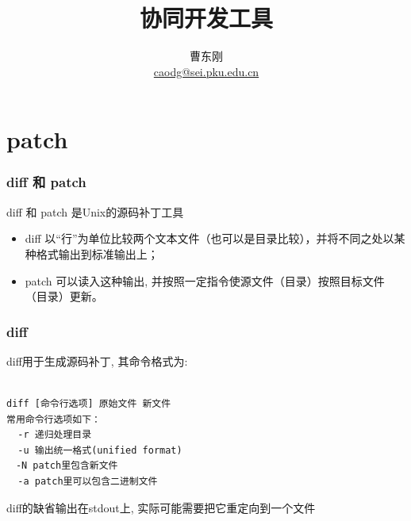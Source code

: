 \documentclass[compress]{beamer}
\begin{document}
					
\title{协同开发工具}

\author[\href{http://c.pku.edu.cn/}{http://c.pku.edu.cn/}]
{曹东刚\\\href{mailto:caodg@sei.pku.edu.cn}{caodg@sei.pku.edu.cn}}


\date{}


\begin{frame}
	\titlepage
\end{frame}

\section{patch}

\begin{frame}
\frametitle{diff 和 patch}

\alert{diff} 和 \alert{patch} 是Unix的源码补丁工具

\begin{itemize}
\item \alert{diff} 以``行''为单位比较两个文本文件（也可以是目录比较），并将不同之处以某种格式输出到标准输出上；
\item \alert{patch} 可以读入这种输出, 并按照一定指令使源文件（目录）按照目标文件（目录）更新。
\end{itemize}

\end{frame}

\begin{frame}[containsverbatim]
\frametitle{diff}
diff用于生成源码补丁, 其命令格式为:\\[1ex]
{\small
\begin{Verbatim}

diff [命令行选项] 原始文件 新文件
常用命令行选项如下：
  -r 递归处理目录 　　　　
  -u 输出统一格式(unified format)
　-N patch里包含新文件
  -a patch里可以包含二进制文件
\end{Verbatim}
}

\alert{diff}的缺省输出在stdout上, 实际可能需要把它重定向到一个文件

\end{frame}
\end{document}
